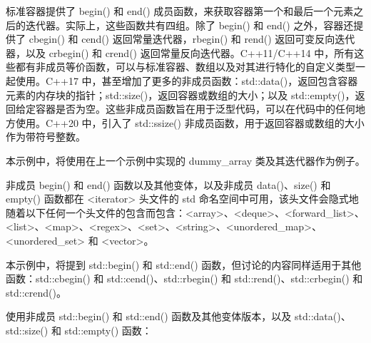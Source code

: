 标准容器提供了 begin() 和 end() 成员函数，来获取容器第一个和最后一个元素之后的迭代器。实际上，这些函数共有四组。除了 begin() 和 end() 之外，容器还提供了 cbegin() 和 cend() 返回常量迭代器，rbegin() 和 rend() 返回可变反向迭代器，以及 crbegin() 和 crend() 返回常量反向迭代器。C++11/C++14 中，所有这些都有非成员等价函数，可以与标准容器、数组以及对其进行特化的自定义类型一起使用。C++17 中，甚至增加了更多的非成员函数：std::data()，返回包含容器元素的内存块的指针；std::size()，返回容器或数组的大小；以及 std::empty()，返回给定容器是否为空。这些非成员函数旨在用于泛型代码，可以在代码中的任何地方使用。C++20 中，引入了 std::ssize() 非成员函数，用于返回容器或数组的大小作为带符号整数。


本示例中，将使用在上一个示例中实现的 dummy\_array 类及其迭代器作为例子。

非成员 begin() 和 end() 函数以及其他变体，以及非成员 data()、size() 和 empty() 函数都在 <iterator> 头文件的 std 命名空间中可用，该头文件会隐式地随着以下任何一个头文件的包含而包含：<array>、<deque>、<forward\_list>、<list>、<map>、<regex>、<set>、<string>、<unordered\_map>、<unordered\_set> 和 <vector>。

本示例中，将提到 std::begin() 和 std::end() 函数，但讨论的内容同样适用于其他函数：std::cbegin() 和 std::cend()、std::rbegin() 和 std::rend()、std::crbegin() 和 std::crend()。


使用非成员 std::begin() 和 std::end() 函数及其他变体版本，以及 std::data()、std::size() 和 std::empty() 函数：

